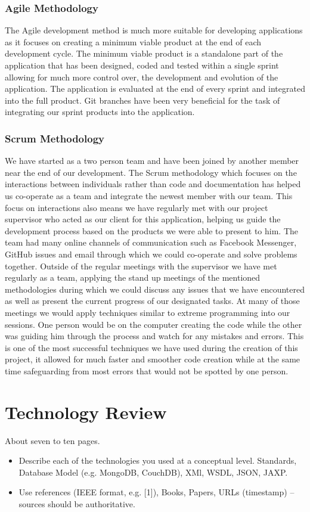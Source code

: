   
  \subsection{Agile Methodology}
  The Agile development method is much more suitable for developing applications as it focuses on creating a minimum viable product at the end of each development cycle. 
  The minimum viable product is a standalone part of the application that has been designed, coded and tested within a single sprint allowing for much more control over, 
  the development and evolution of the application. The application is evaluated at the end of every sprint and integrated into the full product. 
  Git branches have been very beneficial for the task of integrating our sprint products into the application. 
  
  \subsection{Scrum Methodology} 
  We have started as a two person team and have been joined by another member near the end of our development. The Scrum methodology which focuses on the interactions between 
  individuals rather than code and documentation has helped us co-operate as a team and integrate the newest member with our team. 
  This focus on interactions also means we have regularly met with our project supervisor who acted as our client for this application, helping us guide the 
  development process based on the products we were able to present to him. 
  The team had many online channels of communication such as Facebook Messenger, GitHub issues and email through which we could co-operate and solve problems together. 
  Outside of the regular meetings with the supervisor we have met regularly as a team, applying the stand up meetings of the mentioned methodologies during which 
  we could discuss any issues that we have encountered as well as present the current progress of our designated tasks. 
  At many of those meetings we would apply techniques similar to extreme programming into our sessions\cite{scrum}. 
  One person would be on the computer creating the code while the other was guiding him through the process and watch for any mistakes and errors. 
  This is one of the most successful techniques we have used during the creation of this project, it allowed for much faster and smoother code creation while 
  at the same time safeguarding from most errors that would not be spotted by one person.


\chapter{Technology Review}
About seven to ten pages.
\begin{itemize}
\item Describe each of the technologies you used at a conceptual level. Standards, Database Model (e.g. MongoDB, CouchDB), XMl, WSDL, JSON, JAXP.
\item Use references (IEEE format, e.g. [1]), Books, Papers, URLs (timestamp) – sources should be authoritative. 
\end{itemize}

